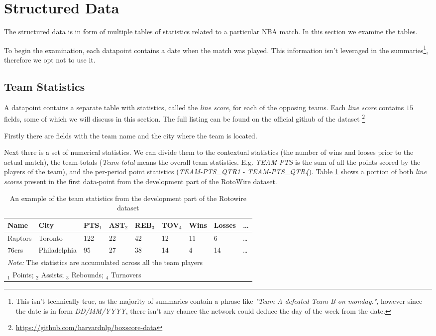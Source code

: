 \section{Structured Data} \label{section:structured_data}

The structured data is in form of multiple tables of statistics related to a particular NBA match. In this section we examine the tables.

To begin the examination, each datapoint contains a date when the match was played. This information isn't leveraged in the summaries\footnote{This isn't technically true, as the majority of summaries contain a phrase like \emph{"Team A defeated Team B on monday."}, however since the date is in form \emph{DD/MM/YYYY}, there isn't any chance the network could deduce the day of the week from the date.}, therefore we opt not to use it.

\subsection{Team Statistics}

A datapoint contains a separate table with statistics, called the \emph{line score}, for each of the opposing teams. Each \emph{line score} contains $15$ fields, some of which we will discuss in this section. The full listing can be found on the official github of the dataset \footnote{\label{note1}\url{https://github.com/harvardnlp/boxscore-data}}

Firstly there are fields with the team name and the city where the team is located.

Next there is a set of numerical statistics. We can divide them to the contextual statistics (the number of wins and looses prior to the actual match), the team-totals (\emph{Team-total} means the overall team statistics. E.g. \emph{TEAM-PTS} is the sum of all the points scored by the players of the team), and the per-period point statistics (\emph{TEAM-PTS\_QTR1} - \emph{TEAM-PTS\_QTR4}). Table \ref{table:example_team_stats} shows a portion of both \emph{line scores} present in the first data-point from the development part of the RotoWire dataset.

\begin{table}[bh!]
    \centering
    \begin{tabular}{lllllllll}
        \toprule
        Name    & City         & PTS$_1$ & AST$_2$ & REB$_3$ & TOV$_4$ & Wins & Losses  &\dots \\
        \midrule
        Raptors & Toronto      & 122 & 22  & 42  & 12  & 11   & 6       &\dots \\
        76ers   & Philadelphia & 95  & 27  & 38  & 14  & 4    & 14     &\dots \\
        \bottomrule
        \multicolumn{9}{l}{\footnotesize \textit{Note:} The statistics are accumulated across all the team players} \\
        \multicolumn{9}{l}{\footnotesize $_1$ Points; $_2$ Assists; $_3$ Rebounds; $_4$ Turnovers}    \end{tabular}
    \caption{\centering An example of the team statistics from the development part of the Rotowire dataset} \label{table:example_team_stats}
\end{table}

